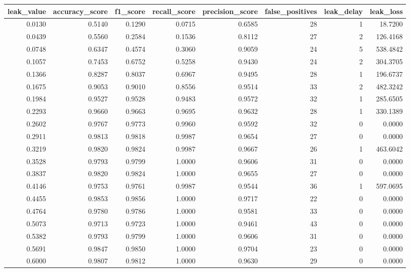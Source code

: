 \begin{tabular}{rrrrrrrr}
\toprule
leak\_value & accuracy\_score & f1\_score & recall\_score & precision\_score & false\_positives & leak\_delay & leak\_loss \\
\midrule
0.0130 & 0.5140 & 0.1290 & 0.0715 & 0.6585 & 28 & 1 & 18.7200 \\
0.0439 & 0.5560 & 0.2584 & 0.1536 & 0.8112 & 27 & 2 & 126.4168 \\
0.0748 & 0.6347 & 0.4574 & 0.3060 & 0.9059 & 24 & 5 & 538.4842 \\
0.1057 & 0.7453 & 0.6752 & 0.5258 & 0.9430 & 24 & 2 & 304.3705 \\
0.1366 & 0.8287 & 0.8037 & 0.6967 & 0.9495 & 28 & 1 & 196.6737 \\
0.1675 & 0.9053 & 0.9010 & 0.8556 & 0.9514 & 33 & 2 & 482.3242 \\
0.1984 & 0.9527 & 0.9528 & 0.9483 & 0.9572 & 32 & 1 & 285.6505 \\
0.2293 & 0.9660 & 0.9663 & 0.9695 & 0.9632 & 28 & 1 & 330.1389 \\
0.2602 & 0.9767 & 0.9773 & 0.9960 & 0.9592 & 32 & 0 & 0.0000 \\
0.2911 & 0.9813 & 0.9818 & 0.9987 & 0.9654 & 27 & 0 & 0.0000 \\
0.3219 & 0.9820 & 0.9824 & 0.9987 & 0.9667 & 26 & 1 & 463.6042 \\
0.3528 & 0.9793 & 0.9799 & 1.0000 & 0.9606 & 31 & 0 & 0.0000 \\
0.3837 & 0.9820 & 0.9824 & 1.0000 & 0.9655 & 27 & 0 & 0.0000 \\
0.4146 & 0.9753 & 0.9761 & 0.9987 & 0.9544 & 36 & 1 & 597.0695 \\
0.4455 & 0.9853 & 0.9856 & 1.0000 & 0.9717 & 22 & 0 & 0.0000 \\
0.4764 & 0.9780 & 0.9786 & 1.0000 & 0.9581 & 33 & 0 & 0.0000 \\
0.5073 & 0.9713 & 0.9723 & 1.0000 & 0.9461 & 43 & 0 & 0.0000 \\
0.5382 & 0.9793 & 0.9799 & 1.0000 & 0.9606 & 31 & 0 & 0.0000 \\
0.5691 & 0.9847 & 0.9850 & 1.0000 & 0.9704 & 23 & 0 & 0.0000 \\
0.6000 & 0.9807 & 0.9812 & 1.0000 & 0.9630 & 29 & 0 & 0.0000 \\
\bottomrule
\end{tabular}
